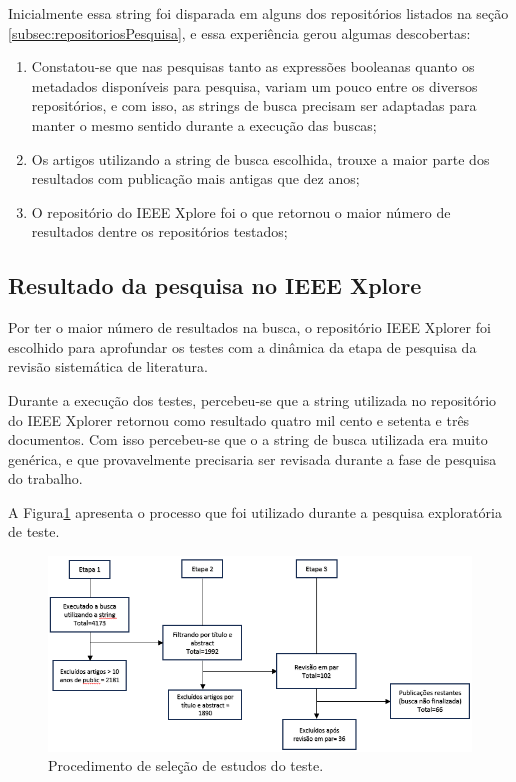 Inicialmente essa string foi disparada em alguns dos repositórios listados na seção \ref{subsec:repositoriosPesquisa}, e essa experiência gerou algumas descobertas:

\begin{enumerate}
    \item Constatou-se que nas pesquisas tanto as expressões booleanas quanto os metadados disponíveis para pesquisa, variam um pouco entre os diversos repositórios, e com isso, as strings de busca precisam ser adaptadas para manter o mesmo sentido durante a execução das buscas;
    \item Os artigos utilizando a string de busca escolhida, trouxe a maior parte dos resultados com publicação mais antigas que dez anos;
    \item O repositório do IEEE  Xplore \cite{repositorioIEEE} foi o que retornou o maior número de resultados dentre os repositórios testados; 
\end{enumerate}

\subsection{Resultado da pesquisa no IEEE Xplore}

Por ter o maior número de resultados na busca, o repositório IEEE Xplorer foi escolhido para aprofundar os testes com a dinâmica da etapa de pesquisa da revisão sistemática de literatura.

Durante a execução dos testes, percebeu-se que a string utilizada no repositório do IEEE Xplorer retornou como resultado quatro mil cento e setenta e três documentos. Com isso percebeu-se que o a string de busca utilizada era muito genérica, e que provavelmente precisaria ser revisada durante a fase de pesquisa do trabalho.

A Figura\ref{fig:rsltest} apresenta o processo que foi utilizado durante a pesquisa exploratória de teste.

\begin{figure}[h!]
\centering
\includegraphics[width=1\textwidth]{img/rslteste.png}
\caption{Procedimento de seleção de estudos do teste.}
\label{fig:rsltest}
\end{figure}

